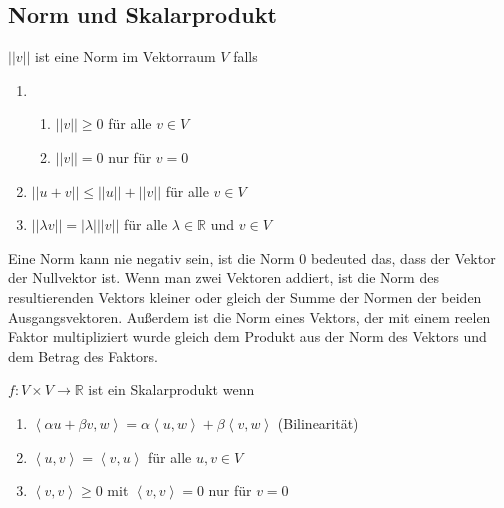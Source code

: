 


%
\subsection{Norm und Skalarprodukt}
\author{Vivien Thi, Max Braun, Luca Bohn}
\begin{Def}
$||v||$ ist eine Norm im Vektorraum $V$ falls
\begin{enumerate}
\item 
\begin{enumerate}
\item $||v|| \geq 0$ für alle $v \in V$
\item $||v|| = 0$ nur für $v = 0$
\end{enumerate}
\item $||u+v|| \leq ||u|| + ||v||$ für alle $v \in V$
\item $|| \lambda v|| = |\lambda| ||v||$ für alle $\lambda \in \mathbb{R}$ und $v \in V$
\end{enumerate}
\end{Def}
Eine Norm kann nie negativ sein, ist die Norm 0 bedeuted das, dass der Vektor der Nullvektor ist. Wenn man zwei Vektoren
addiert, ist die Norm des resultierenden Vektors kleiner oder gleich der Summe der Normen der beiden Ausgangsvektoren. Außerdem ist die
Norm eines Vektors, der mit einem reelen Faktor multipliziert wurde gleich dem Produkt aus der Norm des Vektors und dem 
Betrag des Faktors.

\begin{Def}
$f:V\times V \rightarrow\mathbb{R}$ ist ein Skalarprodukt wenn\\
\begin{enumerate}
\item $\left\langle  \alpha u + \beta v, w\right\rangle = \alpha \left\langle  u,w\right\rangle + \beta \left\langle  v,w\right\rangle $ (Bilinearität)
\item $\left\langle  u,v\right\rangle = \left\langle  v,u\right\rangle $ für alle $u,v \in V$
\item $\left\langle  v,v\right\rangle \geq 0$ mit $\left\langle  v,v\right\rangle = 0$ nur für $v = 0$\\
\end{enumerate}
\end{Def}
 

